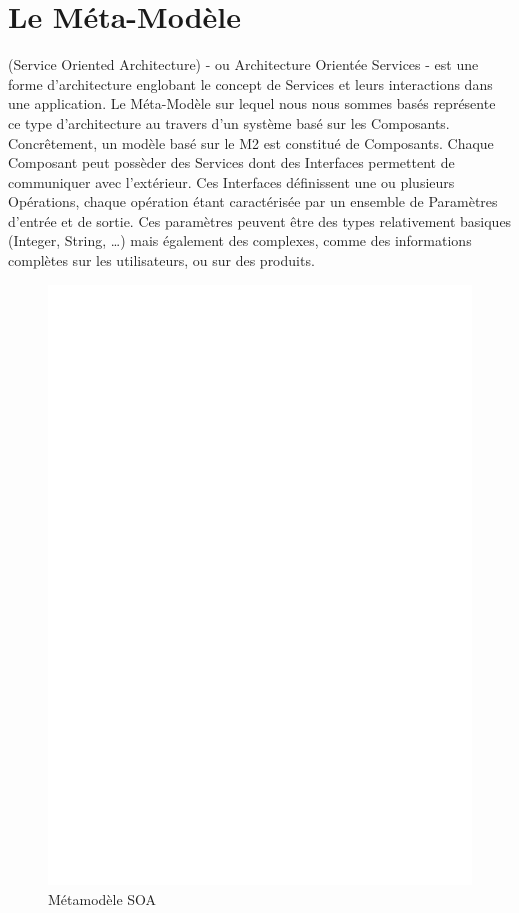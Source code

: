 \section{Le Méta-Modèle \kwsoa}\label{sub:soa}

\kwsoa{} (Service Oriented Architecture) - ou Architecture Orientée Services - est une forme d'architecture englobant le concept de Services et leurs interactions dans une application. Le Méta-Modèle \kwsoa{} sur lequel nous nous sommes basés représente ce type d'architecture au travers d'un système basé sur les Composants. Concrêtement, un modèle basé sur le M2 \kwsoa est constitué de Composants. Chaque Composant peut possèder des Services dont des Interfaces permettent de communiquer avec l'extérieur. Ces Interfaces définissent une ou plusieurs Opérations, chaque opération étant caractérisée par un ensemble de Paramètres d'entrée et de sortie. Ces paramètres peuvent être des types relativement basiques (Integer, String, \dots) mais également des  complexes, comme des informations complètes sur les utilisateurs, ou sur des produits.	

\begin{figure}[htb]
  \centering
  \includegraphics[scale=.3]{img/SOA.eps}
  \caption{Métamodèle SOA}
  \label{fig:soa}
\end{figure}

